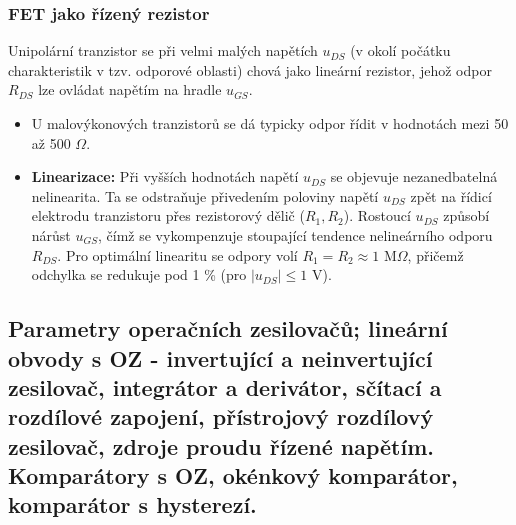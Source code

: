     \subsubsection{FET jako řízený rezistor}
        Unipolární tranzistor se při velmi malých napětích $u_{DS}$ (v okolí počátku charakteristik v tzv. odporové oblasti) chová jako lineární rezistor, jehož odpor $R_{DS}$ lze ovládat napětím na hradle $u_{GS}$.
        
        \begin{itemize}
            \item U malovýkonových tranzistorů se dá typicky odpor řídit v hodnotách mezi 50 až 500 $\Omega$.
            \item \textbf{Linearizace:} Při vyšších hodnotách napětí $u_{DS}$ se objevuje nezanedbatelná nelinearita. Ta se odstraňuje přivedením poloviny napětí $u_{DS}$ zpět na řídicí elektrodu tranzistoru přes rezistorový dělič ($R_1, R_2$). Rostoucí $u_{DS}$ způsobí nárůst $u_{GS}$, čímž se vykompenzuje stoupající tendence nelineárního odporu $R_{DS}$. Pro optimální linearitu se odpory volí $R_1 = R_2 \approx 1$ M$\Omega$, přičemž odchylka se redukuje pod 1 \% (pro $|u_{DS}| \le 1$ V).
        \end{itemize}
\subsection{Parametry operačních zesilovačů; lineární obvody s OZ - invertující a neinvertující zesilovač, integrátor a derivátor, sčítací a rozdílové zapojení, přístrojový rozdílový zesilovač, zdroje proudu řízené napětím. Komparátory s OZ, okénkový komparátor, komparátor s hysterezí.}
